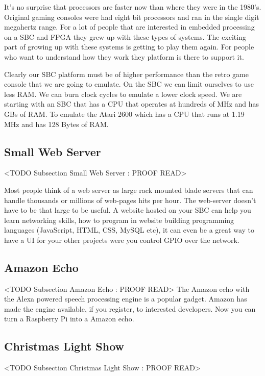 It's no surprise that processors are faster now than where they were in the 1980's. Original gaming consoles were had eight bit processors and ran in the single digit megahertz range. For a lot of people that are interested in embedded processing on a \ac{SBC} and \ac{FPGA} they grew up with these types of systems. The exciting part of growing up with these systems is getting to play them again. For people who want to understand how they work they platform is there to support it.

Clearly our \ac{SBC} platform must be of higher performance than the retro game console that we are going to emulate. On the \ac{SBC} we can limit ourselves to use less \ac{RAM}. We can burn clock cycles to emulate a lower clock speed. We are starting with an \ac{SBC} that has a \ac{CPU} that operates at hundreds of \ac{MHz} and has \ac{GBs} of \ac{RAM}. To emulate the Atari 2600 which has a \ac{CPU} that runs at 1.19 \ac{MHz} and has 128 Bytes of \ac{RAM}.

\subsection{Small Web Server}
	<TODO Subsection Small Web Server : PROOF READ>

Most people think of a web server as large rack mounted blade servers that can handle thousands or millions of web-pages hits per hour. The web-server doesn't have to be that large to be useful. A website hosted on your \ac{SBC} can help you learn networking skills, how to program in website building programming languages (JavaScript, \ac{HTML}, \ac{CSS}, MySQL etc), it can even be a great way to have a \ac{UI} for your other projects were you control \ac{GPIO} over the network.

\subsection{Amazon Echo}
	<TODO Subsection Amazon Echo : PROOF READ>
The Amazon echo with the Alexa powered speech processing engine is a popular gadget. Amazon has made the engine available, if you register, to interested developers. Now you can turn a Raspberry Pi into a Amazon echo. 
	
	
\subsection{Christmas Light Show}
	<TODO Subsection Christmas Light Show : PROOF READ>

